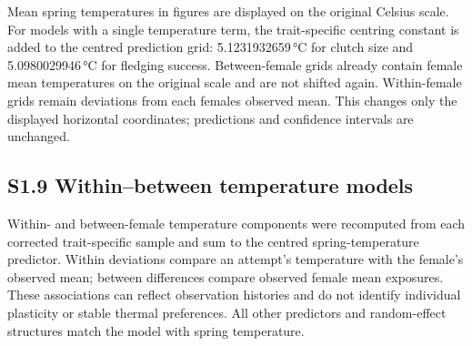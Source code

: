 \documentclass{article}
\begin{document}
Mean spring temperatures in figures are displayed on the original Celsius scale. For models with a single temperature term, the trait-specific centring constant is added to the centred prediction grid: 5.1231932659\,\si{\degreeCelsius} for clutch size and 5.0980029946\,\si{\degreeCelsius} for fledging success. Between-female grids already contain female mean temperatures on the original scale and are not shifted again. Within-female grids remain deviations from each female\textquotesingle s observed mean. This changes only the displayed horizontal coordinates; predictions and confidence intervals are unchanged.

\subsection{S1.9 Within--between temperature models}
\label{sec:within-between-supplement}

Within- and between-female temperature components were recomputed from each corrected trait-specific sample and sum to the centred spring-temperature predictor. Within deviations compare an attempt's temperature with the female's observed mean; between differences compare observed female mean exposures. These associations can reflect observation histories and do not identify individual plasticity or stable thermal preferences. All other predictors and random-effect structures match the model with spring temperature.
\end{document}
